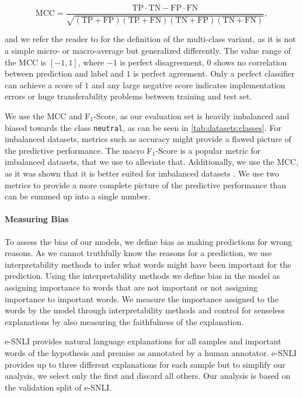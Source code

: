 {\small $$\text{MCC} = \frac{\mathrm
{TP} \cdot \mathrm{TN} - \mathrm{FP} \cdot \mathrm{FN}}{\sqrt{(\mathrm{TP}+\mathrm{FP})(\mathrm{TP}+\mathrm{FN})(\mathrm{TN}+\mathrm{FP})(\mathrm{TN}+\mathrm{FN})}},$$}

and we refer the reader to \citet{mccMultiClass} for the definition of the multi-class variant, as it is not a simple micro- or macro-average but generalized differently. The value range of the \ac{MCC} is $[-1, 1]$, where $-1$ is perfect disagreement, $0$ shows no correlation between prediction and label and $1$ is perfect agreement. Only a perfect classifier can achieve a score of $1$ and any large negative score indicates implementation errors or huge transferability problems between training and test set.

We use the \ac{MCC} and F$_1$-Score, as our evaluation set is heavily imbalanced and biased towards the class \texttt{neutral}, as can be seen in \autoref{tab:datasets:classes}. For imbalanced datasets, metrics such as accuracy might provide a flawed picture of the predictive performance. The macro F$_1$-Score is a popular metric for imbalanced datasets, that we use to alleviate that. Additionally, we use the \ac{MCC}, as it was shown that it is better suited for imbalanced datasets \cite{mccGood}. We use two metrics to provide a more complete picture of the predictive performance than can be summed up into a single number.

\paragraph{Measuring Bias} \label{sec:exp:eval:bias}
To assess the bias of our models, we define bias as making predictions for wrong reasons. As we cannot truthfully know the reasons for a prediction, we use interpretability methods to infer what words might have been important for the prediction. Using the interpretability methods we define bias in the model as assigning importance to words that are not important or not assigning importance to important words. We measure the importance assigned to the words by the model through interpretability methods and control for senseless explanations by also measuring the faithfulness of the explanation.

\ac{e-SNLI} provides natural language explanations for all samples and important words of the hypothesis and premise as annotated by a human annotator. \ac{e-SNLI} provides up to three different explanations for each sample but to simplify our analysis, we select only the first and discard all others. Our analysis is based on the validation split of \ac{e-SNLI}.

